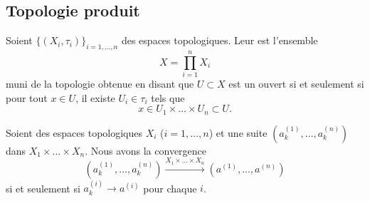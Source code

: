 \subsection{Topologie produit}

\begin{definition}      \label{DefIINHooAAjTdY}
    Soient $\{ (X_i,\tau_i) \}_{i=1,\ldots, n}$ des espaces topologiques. Leur  est l'ensemble
    \begin{equation}
        X=\prod_{i=1}^nX_i
    \end{equation}
    muni de la topologie obtenue en disant que \( U\subset X\) est un ouvert si et seulement si pour tout \( x\in U\), il existe \( U_i\in \tau_i\) tels que 
    \begin{equation}
        x\in U_1\times \ldots \times U_n\subset U.
    \end{equation}
\end{definition}

\begin{proposition}
    Soient des espaces topologiques \( X_i\) (\( i=1,\ldots, n\)) et une suite \( (a^{(1)}_k,\ldots, a^{(n)}_k)\) dans \( X_1\times\ldots \times X_n\). Nous avons la convergence
    \begin{equation}
        (a^{(1)}_k,\ldots, a^{(n)}_k)\stackrel{X_1\times\ldots \times X_n}{\longrightarrow}(a^{(1)},\ldots, a^{(n)})
    \end{equation}
    si et seulement si \( a^{(i)}_k\to a^{(i)}\) pour chaque \( i\).
\end{proposition}

